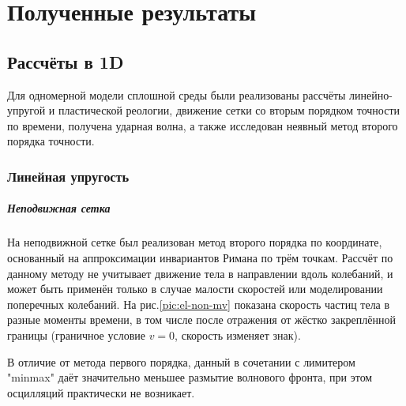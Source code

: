 \newpage
\section{Полученные результаты}
\subsection{Рассчёты в 1D}
Для одномерной модели сплошной среды были реализованы рассчёты линейно-упругой и пластической реологии, движение сетки со вторым порядком точности по времени, получена ударная волна, а также исследован неявный метод второго порядка точности.
\subsubsection{Линейная упругость}
\subparagraph{Неподвижная сетка}
На неподвижной сетке был реализован метод второго порядка по координате, основанный на аппроксимации инвариантов Римана по трём точкам. Рассчёт по данному методу не учитывает движение тела в направлении вдоль колебаний, и может быть применён только в случае малости скоростей или моделировании поперечных колебаний. На      
рис.\ref{pic:el-non-mv} показана скорость частиц тела в разные моменты времени, в том числе после отражения от жёстко закреплённой границы (граничное условие $v = 0$, скорость изменяет знак).

В отличие от метода первого порядка, данный в сочетании с лимитером "minmax" даёт значительно меньшее размытие волнового фронта, при этом осцилляций практически не возникает.

